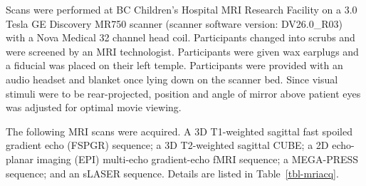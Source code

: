 \documentclass[
true
]{sn-jnl}
\begin{document}
Scans were performed at BC Children's Hospital MRI Research Facility on
a 3.0 Tesla GE Discovery MR750 scanner (scanner software version:
DV26.0\_R03) with a Nova Medical 32 channel head coil. Participants
changed into scrubs and were screened by an MRI technologist.
Participants were given wax earplugs and a fiducial was placed on their
left temple. Participants were provided with an audio headset and
blanket once lying down on the scanner bed. Since visual stimuli were to
be rear-projected, position and angle of mirror above patient eyes was
adjusted for optimal movie viewing.

The following MRI scans were acquired. A 3D T1-weighted sagittal fast
spoiled gradient echo (FSPGR) sequence; a 3D T2-weighted sagittal CUBE;
a 2D echo-planar imaging (EPI) multi-echo gradient-echo fMRI sequence; a
MEGA-PRESS sequence; and an sLASER sequence. Details are listed in
Table~\ref{tbl-mriacq}.
\end{document}
